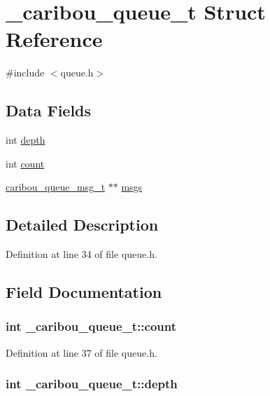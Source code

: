 \hypertarget{struct__caribou__queue__t}{\section{\-\_\-caribou\-\_\-queue\-\_\-t Struct Reference}
\label{struct__caribou__queue__t}
}


{\ttfamily \#include $<$queue.\-h$>$}

\subsection*{Data Fields}
\begin{DoxyCompactItemize}
\item 
int \hyperlink{struct__caribou__queue__t_a36561a93d0a9633ac57652fccf226a0d}{depth}
\item 
int \hyperlink{struct__caribou__queue__t_ad2ba7b33d5fc10a0e1e9a69c5980f76d}{count}
\item 
\hyperlink{queue_8h_aa9897960939163cc502ee337bd73256d}{caribou\-\_\-queue\-\_\-msg\-\_\-t} $\ast$$\ast$ \hyperlink{struct__caribou__queue__t_ab8bca88f308064d85e3984e7309a60a3}{msgs}
\end{DoxyCompactItemize}


\subsection{Detailed Description}


Definition at line 34 of file queue.\-h.



\subsection{Field Documentation}
\hypertarget{struct__caribou__queue__t_ad2ba7b33d5fc10a0e1e9a69c5980f76d}{
\subsubsection[{count}]{\setlength{\rightskip}{0pt plus 5cm}int \-\_\-caribou\-\_\-queue\-\_\-t\-::count}}\label{struct__caribou__queue__t_ad2ba7b33d5fc10a0e1e9a69c5980f76d}


Definition at line 37 of file queue.\-h.

\hypertarget{struct__caribou__queue__t_a36561a93d0a9633ac57652fccf226a0d}{
\subsubsection[{depth}]{\setlength{\rightskip}{0pt plus 5cm}int \-\_\-caribou\-\_\-queue\-\_\-t\-::depth}}\label{struct__caribou__queue__t_a36561a93d0a9633ac57652fccf226a0d}


